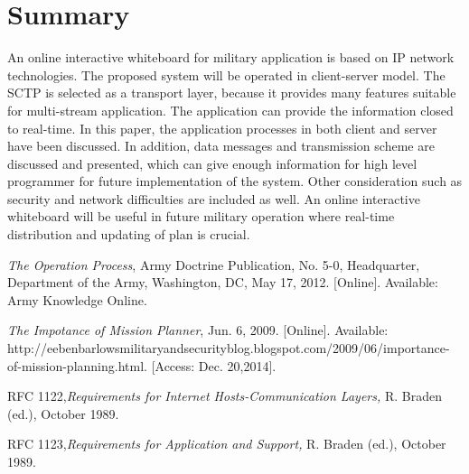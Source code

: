 \documentclass[conference]{IEEEtran}
\begin{document}
\section{Summary}
An online interactive whiteboard for military application is based on IP network technologies. 
The proposed system will be operated in client-server model. 
The SCTP is selected as a transport layer, because it provides many features suitable for multi-stream application. 
The application can provide the information closed to real-time. 
In this paper, the application processes in both client and server have been discussed. 
In addition, data messages and transmission scheme are discussed and presented, which can give enough information for high level programmer for future implementation of the system. 
Other consideration such as security and network difficulties are included as well. 
An online interactive whiteboard will be useful in future military operation where real-time distribution and updating of plan is crucial.

\begin{thebibliography}{1}

   {\em The Operation Process}, Army Doctrine Publication, No. 5-0, Headquarter, Department of the Army, Washington, DC, May 17, 2012. [Online]. Available: Army Knowledge Online.

   {\em The Impotance of Mission Planner}, Jun. 6, 2009. [Online]. Available: http://eebenbarlowsmilitaryandsecurityblog.blogspot.com/2009/06/importance-of-mission-planning.html. [Access: Dec. 20,2014].
  
   RFC 1122,{\em Requirements for Internet Hosts-Communication Layers,} R. Braden (ed.), October 1989.
  
   RFC 1123,{\em Requirements for Application and Support,} R. Braden (ed.), October 1989.
  
  
\end{thebibliography}
\end{document}
